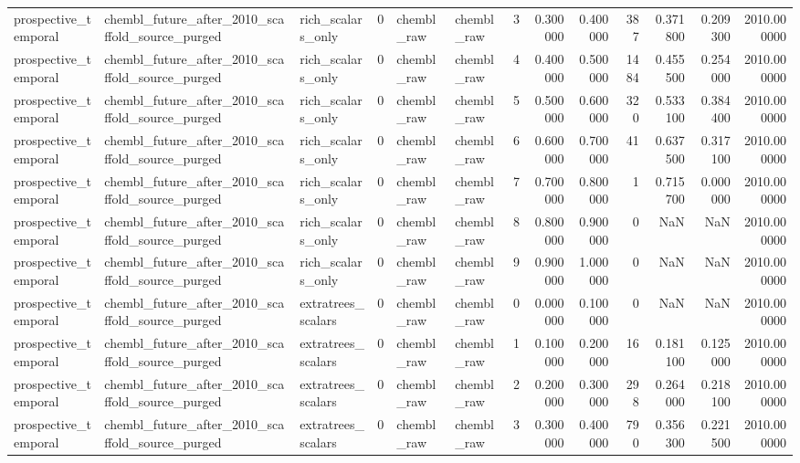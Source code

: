 \begin{longtable}{lllrllrrrrrrr}
prospective\_temporal & chembl\_future\_after\_2010\_scaffold\_source\_purged & rich\_scalars\_only & 0 & chembl\_raw & chembl\_raw & 3 & 0.300000 & 0.400000 & 387 & 0.371800 & 0.209300 & 2010.000000 \\
prospective\_temporal & chembl\_future\_after\_2010\_scaffold\_source\_purged & rich\_scalars\_only & 0 & chembl\_raw & chembl\_raw & 4 & 0.400000 & 0.500000 & 1484 & 0.455500 & 0.254000 & 2010.000000 \\
prospective\_temporal & chembl\_future\_after\_2010\_scaffold\_source\_purged & rich\_scalars\_only & 0 & chembl\_raw & chembl\_raw & 5 & 0.500000 & 0.600000 & 320 & 0.533100 & 0.384400 & 2010.000000 \\
prospective\_temporal & chembl\_future\_after\_2010\_scaffold\_source\_purged & rich\_scalars\_only & 0 & chembl\_raw & chembl\_raw & 6 & 0.600000 & 0.700000 & 41 & 0.637500 & 0.317100 & 2010.000000 \\
prospective\_temporal & chembl\_future\_after\_2010\_scaffold\_source\_purged & rich\_scalars\_only & 0 & chembl\_raw & chembl\_raw & 7 & 0.700000 & 0.800000 & 1 & 0.715700 & 0.000000 & 2010.000000 \\
prospective\_temporal & chembl\_future\_after\_2010\_scaffold\_source\_purged & rich\_scalars\_only & 0 & chembl\_raw & chembl\_raw & 8 & 0.800000 & 0.900000 & 0 & NaN & NaN & 2010.000000 \\
prospective\_temporal & chembl\_future\_after\_2010\_scaffold\_source\_purged & rich\_scalars\_only & 0 & chembl\_raw & chembl\_raw & 9 & 0.900000 & 1.000000 & 0 & NaN & NaN & 2010.000000 \\
prospective\_temporal & chembl\_future\_after\_2010\_scaffold\_source\_purged & extratrees\_scalars & 0 & chembl\_raw & chembl\_raw & 0 & 0.000000 & 0.100000 & 0 & NaN & NaN & 2010.000000 \\
prospective\_temporal & chembl\_future\_after\_2010\_scaffold\_source\_purged & extratrees\_scalars & 0 & chembl\_raw & chembl\_raw & 1 & 0.100000 & 0.200000 & 16 & 0.181100 & 0.125000 & 2010.000000 \\
prospective\_temporal & chembl\_future\_after\_2010\_scaffold\_source\_purged & extratrees\_scalars & 0 & chembl\_raw & chembl\_raw & 2 & 0.200000 & 0.300000 & 298 & 0.264000 & 0.218100 & 2010.000000 \\
prospective\_temporal & chembl\_future\_after\_2010\_scaffold\_source\_purged & extratrees\_scalars & 0 & chembl\_raw & chembl\_raw & 3 & 0.300000 & 0.400000 & 790 & 0.356300 & 0.221500 & 2010.000000 \\

\end{longtable}
